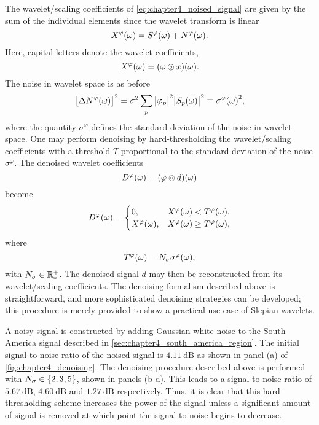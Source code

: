 The wavelet/scaling coefficients of \cref{eq:chapter4_noised_signal} are given by the sum of the individual elements since the wavelet transform is linear
%
\begin{equation}
	X^{\varphi}(\omega)
	= S^{\varphi}(\omega) + N^{\varphi}(\omega).
\end{equation}
%
Here, capital letters denote the wavelet coefficients, \ie{}
%
\begin{equation}\label{eq:chapter4_capital_letters}
	X^{\varphi}(\omega) = (\varphi \circledcirc{} x)(\omega).
\end{equation}
%
The noise in wavelet space is as before
%
\begin{equation}
	{\big[\Delta N^{\varphi}(\omega)\big]}^{2}
	= \sigma^{2} \displaystyle\sum\limits_{p} \big\lvert{\varphi}_{p}\big\rvert^{2} \big\lvert{S}_{p}(\omega)\big\rvert^{2}
	\equiv {\sigma^{\varphi}(\omega)}^{2},
\end{equation}
%
where the quantity \(\sigma^{\varphi}\) defines the standard deviation of the noise in wavelet space.
One may perform denoising by hard-thresholding the wavelet/scaling coefficients with a threshold \(T\) proportional to the standard deviation of the noise \(\sigma^{\varphi}\).
The denoised wavelet coefficients
%
\begin{equation}\label{eq:chapter4_denoised_wavelet_coefficients}
	D^{\varphi}(\omega) = (\varphi \circledcirc{} d)(\omega)
\end{equation}
%
become
%
\begin{equation}
	D^{\varphi}(\omega) =
	\begin{cases}
		0,
		 & X^{\varphi}(\omega) < T^{\varphi}(\omega),    \\
		X^{\varphi}(\omega),
		 & X^{\varphi}(\omega) \geq T^{\varphi}(\omega),
	\end{cases}
\end{equation}
%
where
%
\begin{equation}
	T^{\varphi}(\omega)
	= N_{\sigma}\sigma^{\varphi}(\omega),
\end{equation}
%
with \(N_{\sigma} \in \mathbb{R}_{\ast}^{+}{}\).
The denoised signal \(d\) may then be reconstructed from its wavelet/scaling coefficients.
The denoising formalism described above is straightforward, and more sophisticated denoising strategies can be developed; this procedure is merely provided to show a practical use case of Slepian wavelets.

A noisy signal is constructed by adding Gaussian white noise to the South America signal described in \cref{sec:chapter4_south_america_region}.
The initial signal-to-noise ratio of the noised signal is \(\SI{4.11}{\dB}\) as shown in panel (a) of \cref{fig:chapter4_denoising}.
The denoising procedure described above is performed with \(N_{\sigma} \in \{2, 3, 5\}\), shown in panels (b-d).
This leads to a signal-to-noise ratio of \(\SI{5.67}{\dB}\), \(\SI{4.60}{\dB}\) and \(\SI{1.27}{\dB}\) respectively.
Thus, it is clear that this hard-thresholding scheme increases the power of the signal unless a significant amount of signal is removed at which point the signal-to-noise begins to decrease.

